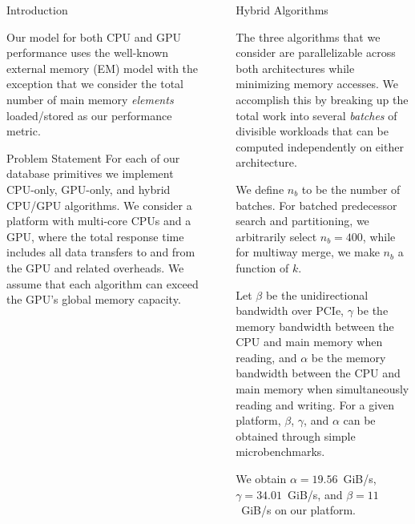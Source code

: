 \documentclass[final]{beamer}
\newlength{\sepwidth}
\newlength{\colwidth}
\newcommand{\separatorcolumn}{\begin{column}{\sepwidth}\end{column}}
\begin{document}
\begin{frame}[t]
\begin{columns}[t]
\begin{column}{\colwidth}
\begin{block}{Introduction}
\begin{description}[font=$\bullet$~\normalfont\scshape\color{red!50!black}]
\item Our model for both CPU and GPU performance uses the well-known external memory (EM) model with the exception that we consider the total number of main memory \emph{elements} loaded/stored as our performance metric.

\end{description}  

  \end{block}

  \begin{alertblock}{Problem Statement}
   For each of our database primitives we implement CPU-only, GPU-only, and hybrid CPU/GPU algorithms. 
   We consider a platform with multi-core CPUs and a GPU, where the total response time includes all 
   data transfers to and from the GPU and related overheads. We assume that each algorithm can exceed the GPU's global memory capacity. 
  \end{alertblock}

\end{column}

\separatorcolumn

\begin{column}{\colwidth}

 \begin{block}{Hybrid Algorithms}

 \begin{description}[font=$\bullet$~\normalfont\scshape\color{red!50!black}]
\item The three algorithms that we consider are parallelizable across both architectures while minimizing memory accesses. We accomplish this by breaking up the total work into several \emph{batches} of divisible workloads that can be computed independently on either architecture. 

\item We define $n_b$ to be the number of batches. For batched predecessor search and partitioning, we arbitrarily select $n_b=400$, while for multiway merge, we make $n_b$ a function of $k$. 

\item Let $\beta$ be the unidirectional bandwidth over PCIe, $\gamma$ be the memory bandwidth between the CPU and main memory when reading, and $\alpha$ be the memory bandwidth between the CPU and main memory when simultaneously reading and writing. For a given platform, $\beta$, $\gamma$, and  $\alpha$ can be obtained through simple microbenchmarks.

\item We obtain $\alpha=19.56$~GiB/s, $\gamma=34.01$~GiB/s, and $\beta=11$~GiB/s on our platform. 
\end{description} 


\end{block}
\end{column}
\end{columns}
\end{frame}
\end{document}
